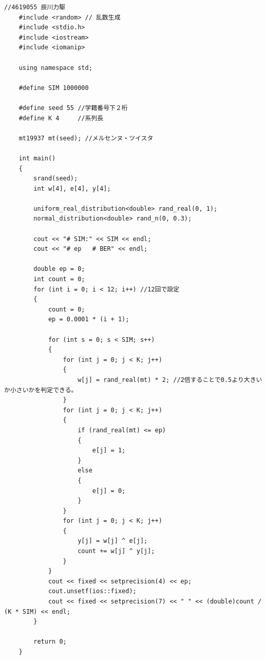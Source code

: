 \documentclass[12pt]{jarticle}
\begin{document}
\begin{lstlisting}[style = lstcpp,caption=kadai3\_mt.cpp]
    //4619055 辰川力駆
    #include <random> // 乱数生成
    #include <stdio.h>
    #include <iostream>
    #include <iomanip>
    
    using namespace std;
    
    #define SIM 1000000
    
    #define seed 55 //学籍番号下２桁
    #define K 4     //系列長
    
    mt19937 mt(seed); //メルセンヌ・ツイスタ
    
    int main()
    {
        srand(seed);
        int w[4], e[4], y[4];
    
        uniform_real_distribution<double> rand_real(0, 1);
        normal_distribution<double> rand_n(0, 0.3);
    
        cout << "# SIM:" << SIM << endl;
        cout << "# ep   # BER" << endl;
    
        double ep = 0;
        int count = 0;
        for (int i = 0; i < 12; i++) //12回で設定
        {
            count = 0;
            ep = 0.0001 * (i + 1);
    
            for (int s = 0; s < SIM; s++)
            {
                for (int j = 0; j < K; j++)
                {
                    w[j] = rand_real(mt) * 2; //2倍することで0.5より大きいか小さいかを判定できる。
                }
                for (int j = 0; j < K; j++)
                {
                    if (rand_real(mt) <= ep)
                    {
                        e[j] = 1;
                    }
                    else
                    {
                        e[j] = 0;
                    }
                }
                for (int j = 0; j < K; j++)
                {
                    y[j] = w[j] ^ e[j];
                    count += w[j] ^ y[j];
                }
            }
            cout << fixed << setprecision(4) << ep;
            cout.unsetf(ios::fixed);
            cout << fixed << setprecision(7) << " " << (double)count / (K * SIM) << endl;
        }
    
        return 0;
    }
\end{lstlisting}

\end{document}
